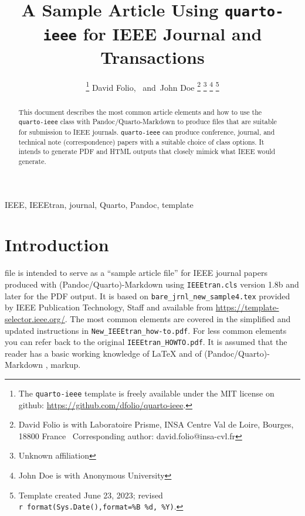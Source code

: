 \documentclass[
  journal,
]{IEEEtran}%
\title{A Sample Article Using \texttt{quarto-ieee} for IEEE Journal and
Transactions}
\author{
\thanks{The \texttt{quarto-ieee} template is freely available under the
MIT license on github: \url{https://github.com/dfolio/quarto-ieee}.}
David Folio\orcidlink{0000-0001-9430-6091},~\IEEEmembership{Member,
IEEE}
and~John Doe%
\thanks{David Folio is with Laboratoire Prisme, INSA Centre Val de
Loire, Bourges, 18800 France%
  Corresponding author: david.folio@insa-cvl.fr
}
\thanks{Unknown affiliation}
\thanks{John Doe is with Anonymous University%
}
\thanks{Template created June 23, 2023; revised
\texttt{r\ format(Sys.Date(),format=\textquotesingle{}\%B\ \%d,\ \%Y\textquotesingle{})}.}
}
\begin{document}


\maketitle

\begin{abstract}
This document describes the most common article elements and how to use
the \texttt{quarto-ieee} class with Pandoc/Quarto-Markdown to produce
files that are suitable for submission to IEEE journals.
\texttt{quarto-ieee} can produce conference, journal, and technical note
(correspondence) papers with a suitable choice of class options. It
intends to generate PDF and HTML outputs that closely mimick what IEEE
would generate.
\end{abstract}
\begin{IEEEkeywords}
IEEE, IEEEtran, journal, Quarto, Pandoc, template
\end{IEEEkeywords}

%


\section{Introduction}\label{sec-intro}

 file is intended to serve as a ``sample article
file'' for IEEE journal papers produced with (Pandoc/Quarto)-Markdown
using \texttt{IEEEtran.cls} version 1.8b and later for the PDF output.
It is based on \texttt{bare\_jrnl\_new\_sample4.tex} provided by IEEE
Publication Technology, Staff and available from
\url{https://template-selector.ieee.org/}. The most common elements are
covered in the simplified and updated instructions in
\texttt{New\_IEEEtran\_how-to.pdf}. For less common elements you can
refer back to the original \texttt{IEEEtran\_HOWTO.pdf}. It is assumed
that the reader has a basic working knowledge of {\LaTeX}
 and of
(Pandoc/Quarto)-Markdown ,
 markup.
\end{document}
